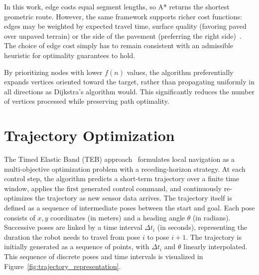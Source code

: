 In this work, edge costs equal segment lengths, so A* returns the shortest geometric route. However, the same framework supports richer cost functions: edges may be weighted by expected travel time, surface quality (favoring paved over unpaved terrain) or the side of the pavement (preferring the right side)~\cite{stahr2023osm}. The choice of edge cost simply has to remain consistent with an admissible heuristic for optimality guarantees to hold.

By prioritizing nodes with lower $f(n)$ values, the algorithm preferentially expands vertices oriented toward the target, rather than propagating uniformly in all directions as Dijkstra's algorithm would. This significantly reduces the number of vertices processed while preserving path optimality.

\section{Trajectory Optimization}
\label{sec:trajectory-optimization}

The Timed Elastic Band (TEB) approach~\cite{rosmann2012teb} formulates local navigation as a multi-objective optimization problem with a receding-horizon strategy. At each control step, the algorithm predicts a short-term trajectory over a finite time window, applies the first generated control command, and continuously re-optimizes the trajectory as new sensor data arrives. The trajectory itself is defined as a sequence of intermediate poses between the start and goal. Each pose consists of $x, y$ coordinates (in meters) and a heading angle $\theta$ (in radians). 
Successive poses are linked by a time interval $\Delta t_i$ (in seconds), representing the duration the robot needs to travel from pose $i$ to pose $i+1$. The trajectory is initially generated as a sequence of points, with $\Delta t_i$ and $\theta$ linearly interpolated. This sequence of discrete poses and time intervals is visualized in Figure~\ref{fig:trajectory_representation}.

